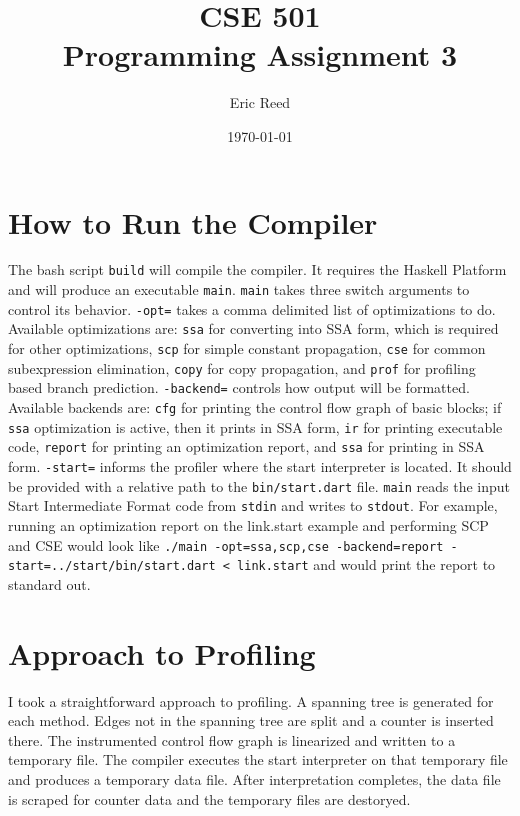 \documentclass{article}
\author{Eric Reed}
\title{CSE 501\\ Programming Assignment 3}
\date{\today}
\begin{document}
\maketitle

\section{How to Run the Compiler}
The bash script \texttt{build} will compile the compiler.
It requires the Haskell Platform and will produce an executable \texttt{main}.
\texttt{main} takes three switch arguments to control its behavior.
\texttt{-opt=} takes a comma delimited list of optimizations to do.
Available optimizations are:
  \texttt{ssa} for converting into SSA form, which is required for other optimizations,
  \texttt{scp} for simple constant propagation,
  \texttt{cse} for common subexpression elimination,
  \texttt{copy} for copy propagation,
  and \texttt{prof} for profiling based branch prediction.
\texttt{-backend=} controls how output will be formatted.
Available backends are:
  \texttt{cfg} for printing the control flow graph of basic blocks; if \texttt{ssa} optimization is active, then it prints in SSA form,
  \texttt{ir} for printing executable code,
  \texttt{report} for printing an optimization report,
  and \texttt{ssa} for printing in SSA form.
\texttt{-start=} informs the profiler where the start interpreter is located.
It should be provided with a relative path to the \texttt{bin/start.dart} file.
\texttt{main} reads the input Start Intermediate Format code from \texttt{stdin} and writes to \texttt{stdout}.
For example, running an optimization report on the link.start example and performing SCP and CSE would look like \texttt{./main -opt=ssa,scp,cse -backend=report -start=../start/bin/start.dart < link.start} and would print the report to standard out.

\section{Approach to Profiling}
I took a straightforward approach to profiling.
A spanning tree is generated for each method.
Edges not in the spanning tree are split and a counter is inserted there.
The instrumented control flow graph is linearized and written to a temporary file.
The compiler executes the start interpreter on that temporary file and produces a temporary data file.
After interpretation completes, the data file is scraped for counter data 
and the temporary files are destoryed.
\end{document}

